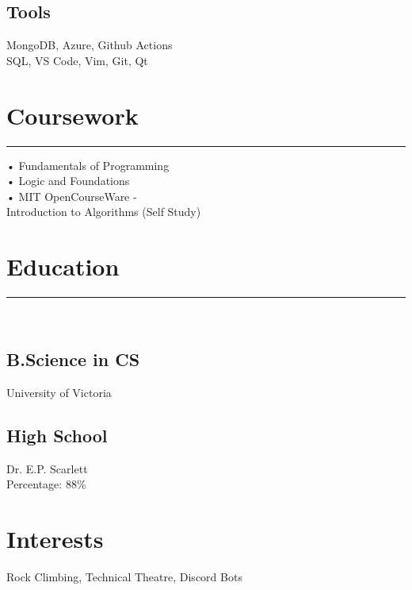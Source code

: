 \documentclass[]{resume}
\begin{document}
\begin{minipage}[t]{0.30\textwidth}
\subsection{Tools}
MongoDB, Azure, Github Actions \\ SQL, VS Code, Vim, Git, Qt
\sectionsep
\section{Coursework}
\noindent\rule{5cm}{0.4pt}

• Fundamentals of Programming\\
• Logic and Foundations\\
• MIT OpenCourseWare - \\Introduction to Algorithms (Self Study)
\sectionsep
\section{Education} 
\noindent\rule{5cm}{0.4pt}\\
\subsection{B.Science in CS}
University of Victoria \\
\vspace{8pt}
\subsection{High School}
Dr. E.P. Scarlett\\
Percentage: 88\%
\section{Interests}
Rock Climbing, Technical Theatre, Discord Bots
\sectionsep
%
%

\end{minipage} 
\hfill
\end{document}
